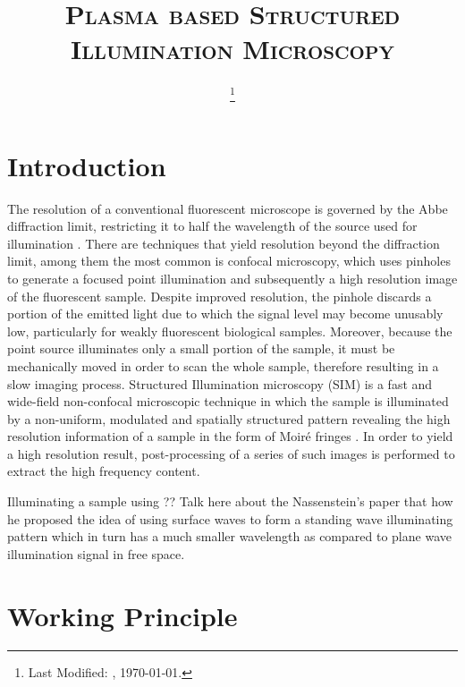 \documentclass[11pt]{article}
\begin{document}
\title{\textsc{Plasma based Structured Illumination Microscopy}\\}
\date{\footnote{Last Modified: \currenttime, \today.}}
\maketitle

\section{Introduction}


The resolution of a conventional fluorescent microscope is governed by the Abbe diffraction limit, restricting it to half the wavelength of the source used for illumination \cite{0521639212}. There are techniques that yield resolution beyond the diffraction limit, among them the most common is confocal microscopy, which uses pinholes to generate a focused point illumination and subsequently a high resolution image of the fluorescent sample. Despite improved resolution, the pinhole discards a portion of the emitted light due to which the signal level may become unusably low, particularly for weakly fluorescent biological samples. Moreover, because the point source illuminates only a small portion of the sample, it must be mechanically moved in order to scan the whole sample, therefore resulting in a slow imaging process. Structured Illumination microscopy (SIM) is a fast and wide-field non-confocal microscopic technique in which the sample is illuminated by a non-uniform, modulated and spatially structured pattern revealing the high resolution information of a sample in the form of Moiré fringes \cite{Gustafsson_2000,Heintzmann1999a}. In order to yield a high resolution result, post-processing of a series of such images is performed to extract the high frequency content.

Illuminating a sample using
?? Talk here about the Nassenstein's paper that how he proposed the idea of using surface waves to form a standing wave illuminating pattern which in turn has a much smaller wavelength as compared to plane wave illumination signal in free space.

\section{Working Principle}
\end{document}
